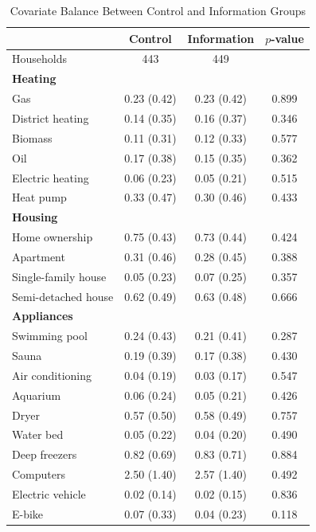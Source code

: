 \begin{table}[H]
\centering
\caption{Covariate Balance Between Control and Information Groups}
\label{table:balance_check}
\begin{threeparttable}
\small
\begin{tabular}{lccc}
\toprule
 & Control & Information & $p$-value \\
\midrule

Households & 443 & 449 &  \\

\midrule
\textbf{Heating} \\
Gas              & 0.23 (0.42) & 0.23 (0.42) & 0.899 \\
District heating & 0.14 (0.35) & 0.16 (0.37) & 0.346 \\
Biomass          & 0.11 (0.31) & 0.12 (0.33) & 0.577 \\
Oil              & 0.17 (0.38) & 0.15 (0.35) & 0.362 \\
Electric heating & 0.06 (0.23) & 0.05 (0.21) & 0.515 \\
Heat pump        & 0.33 (0.47) & 0.30 (0.46) & 0.433 \\

\midrule
\textbf{Housing} \\
Home ownership      & 0.75 (0.43) & 0.73 (0.44) & 0.424 \\
Apartment           & 0.31 (0.46) & 0.28 (0.45) & 0.388 \\
Single-family house & 0.05 (0.23) & 0.07 (0.25) & 0.357 \\
Semi-detached house & 0.62 (0.49) & 0.63 (0.48) & 0.666 \\

\midrule
\textbf{Appliances} \\
Swimming pool   & 0.24 (0.43) & 0.21 (0.41) & 0.287 \\
Sauna           & 0.19 (0.39) & 0.17 (0.38) & 0.430 \\
Air conditioning& 0.04 (0.19) & 0.03 (0.17) & 0.547 \\
Aquarium        & 0.06 (0.24) & 0.05 (0.21) & 0.426 \\
Dryer           & 0.57 (0.50) & 0.58 (0.49) & 0.757 \\
Water bed       & 0.05 (0.22) & 0.04 (0.20) & 0.490 \\
Deep freezers   & 0.82 (0.69) & 0.83 (0.71) & 0.884 \\
Computers       & 2.50 (1.40) & 2.57 (1.40) & 0.492 \\
Electric vehicle& 0.02 (0.14) & 0.02 (0.15) & 0.836 \\
E-bike          & 0.07 (0.33) & 0.04 (0.23) & 0.118 \\


\end{tabular}
\end{threeparttable}
\end{table}
